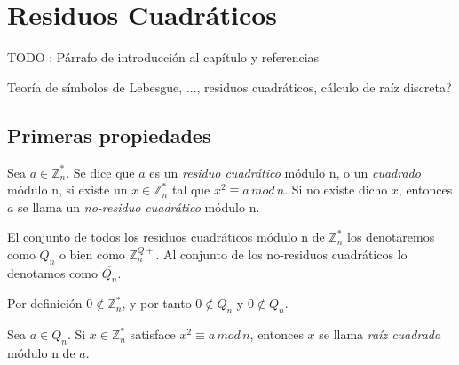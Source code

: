 \chapter{Residuos Cuadráticos}\label{ch:qr} 

TODO : Párrafo de introducción al capítulo y referencias


Teoría de símbolos de Lebesgue, ..., residuos cuadráticos, cálculo de raíz discreta?





\section{Primeras propiedades}


\begin{definition}
	Sea $a\in \mathbb{Z}^*_n$. Se dice que $a$ es un \textit{residuo cuadrático} módulo n, o un \textit{cuadrado} módulo n, si existe un $x \in \mathbb{Z}^*_n$ tal que $x^2 \equiv a \, mod \, n$.
	Si no existe dicho $x$, entonces $a$ se llama un \textit{no-residuo cuadrático} módulo n.
	
	El conjunto de todos los residuos cuadráticos módulo n de $\mathbb{Z}^*_n$ los denotaremos como $Q_n$ o bien como $\mathbb{Z}^{Q+}_n$.
	Al conjunto de los no-residuos cuadráticos lo denotamos como $\overline{Q_n}$.
\end{definition}


\begin{remark}
	Por definición $0 \notin \mathbb{Z}^*_n$, y por tanto $0 \notin Q_n$ y $0 \notin \overline{Q_n}$.
\end{remark}



\begin{definition}
	Sea $a \in Q_n$. Si $x \in \mathbb{Z}^*_n$ satisface $ x^2 \equiv a \, mod \, n$, entonces $x$ se llama \textit{raíz cuadrada} módulo n de $a$.
\end{definition}



